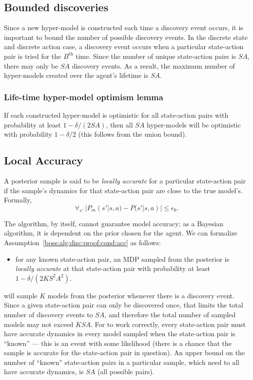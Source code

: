 \subsection{Bounded discoveries}

Since a new hyper-model is constructed each time a discovery event occurs, it is important to bound the number of possible discovery events. In the discrete state and discrete action case, a discovery event occurs when a particular state-action pair is tried for the $B^{\mbox{th}}$ time. Since the number of unique state-action pairs is $S A$, there may only be $S A$ discovery events. As a result, the maximum number of hyper-models created over the agent's lifetime is $S A$.

\subsubsection{Life-time hyper-model optimism lemma}

If each constructed hyper-model is optimistic for all state-action pairs with probability at least $1-\delta/(2 S A)$, then all $S A$ hyper-models will be optimistic with probability $1-\delta/2$ (this follows from the union bound).

\subsection{Local Accuracy}

A posterior sample is said to be \emph{locally accurate} for a particular state-action pair if the sample's dynamics for that state-action pair are close to the true model's. Formally,
$$\forall_{s'} ~ |P_m(s'|s,a)-P(s'|s,a)| \leq \epsilon_0.$$

The  algorithm, by itself, cannot guarantee model accuracy; as a Bayesian algorithm, it is dependent on the prior chosen for the agent. We can formalize Assumption~\ref{boss:alg:disc:proof:cond:acc} as follows:
\begin{itemize}
\item for any known state-action pair, an MDP sampled from the posterior is \emph{locally accurate} at that state-action pair with probability at least $1-\delta/(2 K S^2 A^2)$.
\end{itemize}


 will sample $K$ models from the posterior whenever there is a discovery event. Since a given state-action pair can only be discovered once, that limits the total number of discovery events to $S A$, and therefore the total number of sampled models may not exceed $K S A$. For  to work correctly, every state-action pair must have accurate dynamics in every model sampled when the state-action pair is ``known'' --- this is an event with some likelihood (there is a chance that the sample is accurate for the state-action pair in question). An upper bound on the number of ``known'' state-action pairs in a particular sample, which need to all have accurate dynamics, is $S A$ (all possible pairs).

